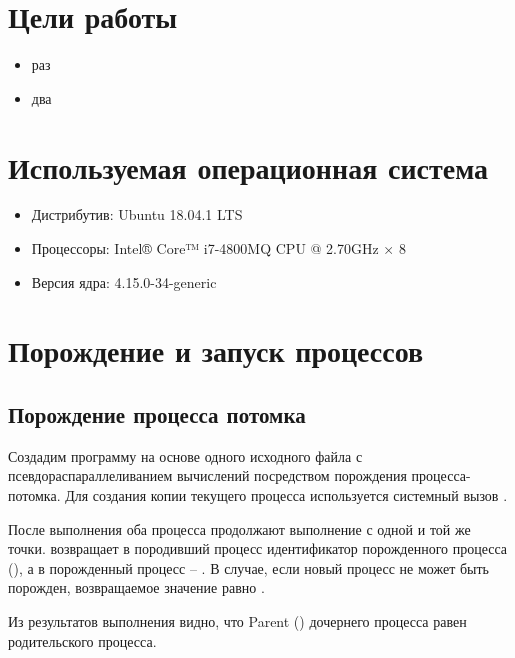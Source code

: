 





\tableofcontents
\newpage

\section{Цели работы}

\begin{itemize}
	\item раз
	\item два
\end{itemize}

\section{Используемая операционная система}

\begin{itemize}
	\item Дистрибутив: Ubuntu 18.04.1 LTS
	\item Процессоры: Intel® Core™ i7-4800MQ CPU @ 2.70GHz × 8
	\item Версия ядра: 4.15.0-34-generic
\end{itemize}

\section{Порождение и запуск процессов}

\subsection{Порождение процесса потомка}

Создадим программу на основе одного исходного файла с псевдораспараллеливанием вычислений посредством порождения процесса-потомка. Для создания копии текущего процесса используется системный вызов .


После выполнения  оба процесса продолжают выполнение с одной и той же точки.  возвращает в породивший процесс идентификатор порожденного
процесса (), а в порожденный процесс -- . В случае, если новый процесс не может быть порожден, возвращаемое значение равно .



Из результатов выполнения видно, что Parent  () дочернего процесса равен  родительского процесса.

